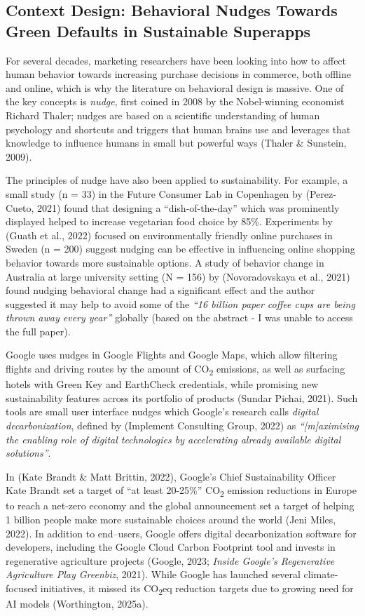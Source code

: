 \documentclass[
  12pt,
  letterpaper,
  DIV=11,
  numbers=noendperiod]{scrartcl}
\begin{document}
\subsection{Context Design: Behavioral Nudges Towards Green Defaults in
Sustainable
Superapps}\label{context-design-behavioral-nudges-towards-green-defaults-in-sustainable-superapps}

For several decades, marketing researchers have been looking into how to
affect human behavior towards increasing purchase decisions in commerce,
both offline and online, which is why the literature on behavioral
design is massive. One of the key concepts is \emph{nudge}, first coined
in 2008 by the Nobel-winning economist Richard Thaler; nudges are based
on a scientific understanding of human psychology and shortcuts and
triggers that human brains use and leverages that knowledge to influence
humans in small but powerful ways (Thaler \& Sunstein, 2009).

The principles of nudge have also been applied to sustainability. For
example, a small study (n = 33) in the Future Consumer Lab in Copenhagen
by (Perez-Cueto, 2021) found that designing a ``dish-of-the-day'' which
was prominently displayed helped to increase vegetarian food choice by
85\%. Experiments by (Guath et al., 2022) focused on environmentally
friendly online purchases in Sweden (n = 200) suggest nudging can be
effective in influencing online shopping behavior towards more
sustainable options. A study of behavior change in Australia at large
university setting (N = 156) by (Novoradovskaya et al., 2021) found
nudging behavioral change had a significant effect and the author
suggested it may help to avoid some of the \emph{``16 billion paper
coffee cups are being thrown away every year''} globally (based on the
abstract - I was unable to access the full paper).

Google uses nudges in Google Flights and Google Maps, which allow
filtering flights and driving routes by the amount of
CO\textsubscript{2} emissions, as well as surfacing hotels with Green
Key and EarthCheck credentials, while promising new sustainability
features across its portfolio of products (Sundar Pichai, 2021). Such
tools are small user interface nudges which Google's research calls
\emph{digital decarbonization}, defined by (Implement Consulting Group,
2022) as \emph{``{[}m{]}aximising the enabling role of digital
technologies by accelerating already available digital solutions''}.

In (Kate Brandt \& Matt Brittin, 2022), Google's Chief Sustainability
Officer Kate Brandt set a target of ``at least 20-25\%''
CO\textsubscript{2} emission reductions in Europe to reach a net-zero
economy and the global announcement set a target of helping 1 billion
people make more sustainable choices around the world (Jeni Miles,
2022). In addition to end--users, Google offers digital decarbonization
software for developers, including the Google Cloud Carbon Footprint
tool and invests in regenerative agriculture projects (Google, 2023;
\emph{Inside {Google}'s Regenerative Agriculture Play {\textbar}
{Greenbiz}}, 2021). While Google has launched several climate-focused
initiatives, it missed its CO\textsubscript{2}eq reduction targets due
to growing need for AI models (Worthington, 2025a).
\end{document}
